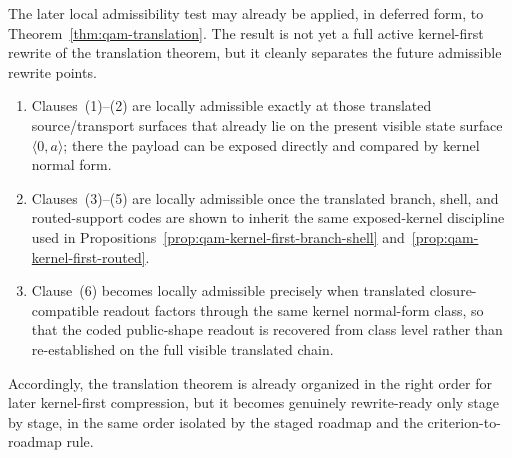 \begin{remark}\label{rem:qam-zero-kernel-translation-local}
The later local admissibility test may already be applied, in deferred form, to Theorem~\ref{thm:qam-translation}. The result is not yet a full active kernel-first rewrite of the translation theorem, but it cleanly separates the future admissible rewrite points.
\begin{enumerate}
\item Clauses~(1)--(2) are locally admissible exactly at those translated source/transport surfaces that already lie on the present visible state surface $\langle 0,a\rangle$; there the payload can be exposed directly and compared by kernel normal form.
\item Clauses~(3)--(5) are locally admissible once the translated branch, shell, and routed-support codes are shown to inherit the same exposed-kernel discipline used in Propositions~\ref{prop:qam-kernel-first-branch-shell} and~\ref{prop:qam-kernel-first-routed}.
\item Clause~(6) becomes locally admissible precisely when translated closure-compatible readout factors through the same kernel normal-form class, so that the coded public-shape readout is recovered from class level rather than re-established on the full visible translated chain.
\end{enumerate}
Accordingly, the translation theorem is already organized in the right order for later kernel-first compression, but it becomes genuinely rewrite-ready only stage by stage, in the same order isolated by the staged roadmap and the criterion-to-roadmap rule.
\end{remark}

